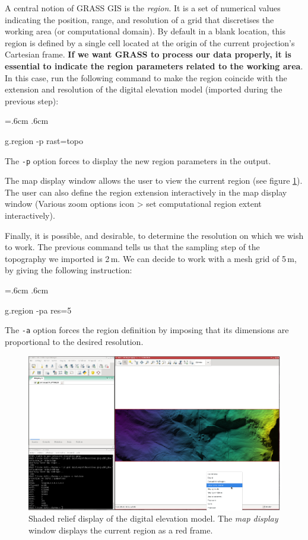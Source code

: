 \documentclass[12pt,oneside]{paper}
\newcommand{\comment}[1]{\marginpar{\begin{flushleft}  #1\end{flushleft}}}
\newenvironment{code}{%
\vspace{2mm}%
\hangindent=.6cm%
\parindent.6cm%
\ttfamily%
\color{gris.3}%
}{
\vspace{2mm}%
}
\begin{document}
A central notion of GRASS GIS is the \emph{region}. It is a set of numerical values indicating the position, range, and resolution of a grid that discretises the working area (or computational domain). By default in a blank location, this region is defined by a single cell located at the origin of the current projection's  Cartesian frame. \comment{\dbend}\textbf{If we want GRASS to process our data properly, it is essential to indicate the region parameters related to the working area}. In this case,  run the following command to make the region coincide with the extension and resolution of the digital elevation model (imported during the previous step):

\begin{code}
g.region -p rast=topo
\end{code}

The \texttt{-p} option forces to display the new region parameters in the output.

The map display window allows the user to view the current region (see figure \ref{fig:raster}). The user can also define the region extension interactively in the map display window (Various zoom options icon > set computational region extent interactively).

Finally, it is possible, and desirable, to determine the resolution on which we wish to work. The previous command tells us that the sampling step of the topography we imported is 2\,m. We can decide to work with a mesh grid of 5\,m, by giving the following instruction:

\begin{code}
g.region -pa res=5
\end{code}

The \texttt{-a} option forces the region definition by imposing that its dimensions are proportional to the desired resolution.

\begin{figure}[!h]
\begin{center}
\includegraphics[width=1\hsize, angle=00]{capture1.eps}
\caption{Shaded relief display of the digital elevation model. The \emph{map display} window displays the current region as a red frame.}
\label{fig:raster}
\end{center}
\end{figure}
\end{document}
